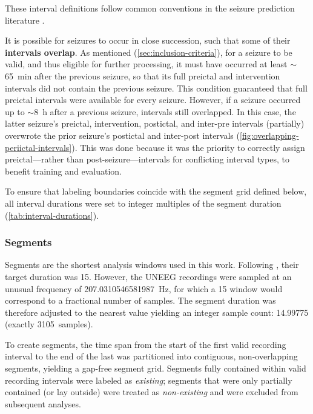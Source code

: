 These interval definitions follow common conventions in the seizure prediction literature \parencite{brinkmann_crowdsourcing_2016, kuhlmann_epilepsyecosystemorg_2018, muller_coherent_2022}.

It is possible for seizures to occur in close succession, such that some of their \textbf{intervals overlap}.
As mentioned (\cref{sec:inclusion-criteria}), for a seizure to be valid, and thus eligible for further processing, it must have occurred at least $\sim$\SI{65}{\minute} after the previous seizure, so that its full preictal and intervention intervals did not contain the previous seizure.
This condition guaranteed that full preictal intervals were available for every seizure.
However, if a seizure occurred up to $\sim$\SI{8}{\hour} after a previous seizure, intervals still overlapped.
In this case, the latter seizure's preictal, intervention, postictal, and inter-pre intervals (partially) overwrote the prior seizure's postictal and inter-post intervals (\cref{fig:overlapping-periictal-intervals}).
This was done because it was the priority to correctly assign preictal---rather than post-seizure---intervals for conflicting interval types, to benefit training and evaluation.


To ensure that labeling boundaries coincide with the segment grid defined below, all interval durations were set to integer multiples of the segment duration (\cref{tab:interval-durations}).

\begin{table}[!htbp]
    \centering
    \caption[Interval durations]{The approximate and exact durations of the defined intervals, as multiples of segments.}
    \label{tab:interval-durations}
    
\end{table}

\subsubsection{Segments}
Segments are the shortest analysis windows used in this work. 
Following \textcite{muller_coherent_2022, yang_seizure_2024}, their target duration was \SI{15}{\sec}.
However, the UNEEG recordings were sampled at an unusual frequency of \SI{207.0310546581987}{\hertz}, for which a \SI{15}{\sec} window would correspond to a fractional number of samples.
The segment duration was therefore adjusted to the nearest value yielding an integer sample count: \SI{14.99775}{\sec} (exactly \SI{3105}{samples}).

To create segments, the time span from the start of the first valid recording interval to the end of the last was partitioned into contiguous, non-overlapping segments, yielding a gap-free segment grid.
Segments fully contained within valid recording intervals were labeled as \textit{existing}; segments that were only partially contained (or lay outside) were treated as \textit{non-existing} and were excluded from subsequent analyses.

